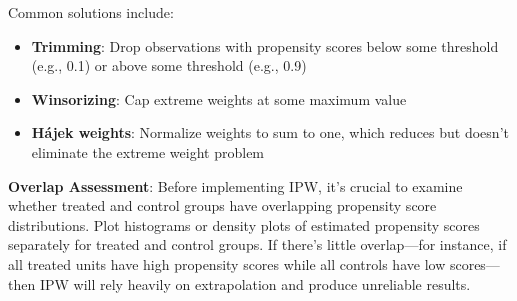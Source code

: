 \documentclass[12pt]{article}
\begin{document}
\begin{multicols}{2}
Common solutions include:
\begin{itemize}
  \item \textbf{Trimming}: Drop observations with propensity scores below some threshold (e.g., 0.1) or above some threshold (e.g., 0.9)
  \item \textbf{Winsorizing}: Cap extreme weights at some maximum value
  \item \textbf{Hájek weights}: Normalize weights to sum to one, which reduces but doesn't eliminate the extreme weight problem
\end{itemize}

\textbf{Overlap Assessment}: Before implementing IPW, it's crucial to examine whether treated and control groups have overlapping propensity score distributions.
Plot histograms or density plots of estimated propensity scores separately for treated and control groups.
If there's little overlap---for instance, if all treated units have high propensity scores while all controls have low scores---then IPW will rely heavily on extrapolation and produce unreliable results.


\end{multicols}
\end{document}
